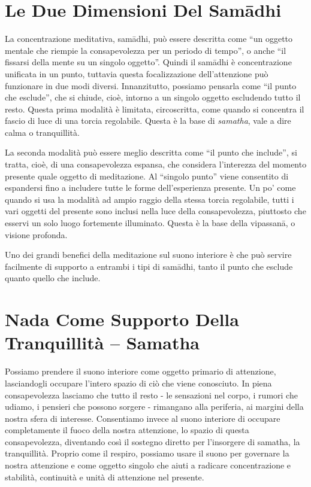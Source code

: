 \section{Le Due Dimensioni Del Samādhi}

La concentrazione meditativa, samādhi, può essere descritta come ``un
oggetto mentale che riempie la consapevolezza per un periodo di tempo'',
o anche ``il fissarsi della mente su un singolo oggetto''. Quindi il
samādhi è concentrazione unificata in un punto, tuttavia questa
focalizzazione dell'attenzione può funzionare in due modi diversi.
Innanzitutto, possiamo pensarla come ``il punto che esclude'', che si
chiude, cioè, intorno a un singolo oggetto escludendo tutto il resto.
Questa prima modalità è limitata, circoscritta, come quando si concentra
il fascio di luce di una torcia regolabile. Questa è la base di
\emph{samatha}, vale a dire calma o tranquillità.

La seconda modalità può essere meglio descritta come ``il punto che
include'', si tratta, cioè, di una consapevolezza espansa, che considera
l'interezza del momento presente quale oggetto di meditazione. Al
``singolo punto'' viene consentito di espandersi fino a includere tutte
le forme dell'esperienza presente. Un po' come quando si usa la modalità
ad ampio raggio della stessa torcia regolabile, tutti i vari oggetti del
presente sono inclusi nella luce della consapevolezza, piuttosto che
esservi un solo luogo fortemente illuminato. Questa è la base della
vipassanā, o visione profonda.

Uno dei grandi benefici della meditazione sul suono interiore è che può
servire facilmente di supporto a entrambi i tipi di samādhi, tanto il
punto che esclude quanto quello che include.

\section{Nada Come Supporto Della Tranquillità -- Samatha}

Possiamo prendere il suono interiore come oggetto primario di
attenzione, lasciandogli occupare l'intero spazio di ciò che viene
conosciuto. In piena consapevolezza lasciamo che tutto il resto - le
sensazioni nel corpo, i rumori che udiamo, i pensieri che possono
sorgere - rimangano alla periferia, ai margini della nostra sfera di
interesse. Consentiamo invece al suono interiore di occupare
completamente il fuoco della nostra attenzione, lo spazio di questa
consapevolezza, diventando così il sostegno diretto per l'insorgere di
samatha, la tranquillità. Proprio come il respiro, possiamo usare il
suono per governare la nostra attenzione e come oggetto singolo che
aiuti a radicare concentrazione e stabilità, continuità e unità di
attenzione nel presente.

